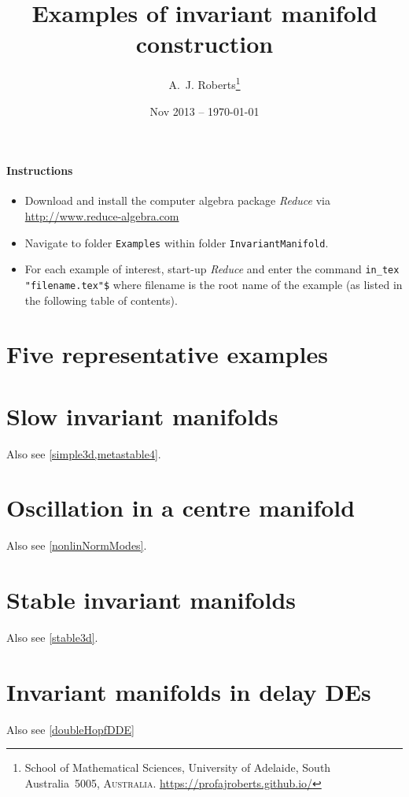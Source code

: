 \documentclass[11pt,a4paper]{refart}
\title{Examples of invariant manifold construction}
\author{A.~J. Roberts\thanks{School of Mathematical Sciences, University of Adelaide, South Australia~5005, \textsc{Australia}.
\url{https://profajroberts.github.io/}}}
\date{Nov 2013 -- \today}
\begin{document}
\maketitle


\paragraph{Instructions}
\begin{itemize}
\item Download and install the computer algebra package
\emph{Reduce} via \url{http://www.reduce-algebra.com}

\item Navigate to folder \verb|Examples| within folder \verb|InvariantManifold|.

\item For each example of interest, start-up \emph{Reduce} and enter the command \verb|in_tex "filename.tex"$|  where filename is the root name of the example (as listed in the following table of contents).

\end{itemize}


\tableofcontents




\section{Five representative examples}












\section{Slow invariant manifolds}

Also see \cref{simple3d,metastable4}.






\section{Oscillation in a centre manifold}

Also see \cref{nonlinNormModes}.







\section{Stable invariant manifolds}

Also see \cref{stable3d}.




\section{Invariant manifolds in delay DEs}

Also see \cref{doubleHopfDDE}






\end{document}
